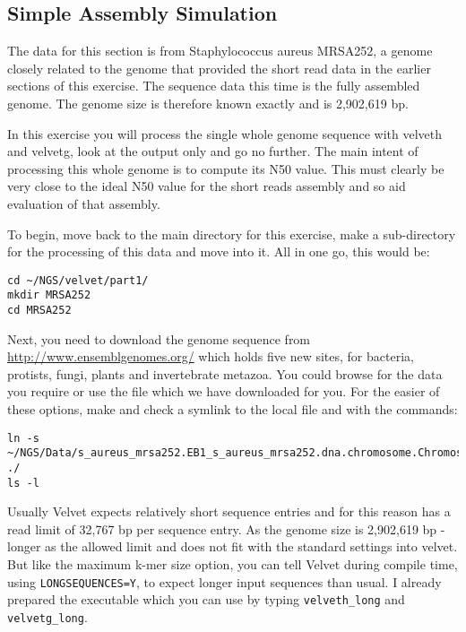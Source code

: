 \subsection{Simple Assembly Simulation}

\begin{note}
The data for this section is from Staphylococcus aureus MRSA252, a genome
closely related to the genome that provided the short read data in the earlier
sections of this exercise. The sequence data this time is the fully assembled
genome. The genome size is therefore known exactly and is 2,902,619 bp.
\end{note}

\begin{information}
In this exercise you will process the single whole genome sequence with velveth
and velvetg, look at the output only and go no further. The main intent of
processing this whole genome is to compute its N50 value. This must clearly be
very close to the ideal N50 value for the short reads assembly and so aid
evaluation of that assembly.
\end{information}

\begin{steps}
To begin, move back to the main directory for this exercise, make a
sub-directory for the processing of this data and move into it. All in one go,
this would be:
\begin{lstlisting}
cd ~/NGS/velvet/part1/ 
mkdir MRSA252 
cd MRSA252
\end{lstlisting}

Next, you need to download the genome sequence from
\url{http://www.ensemblgenomes.org/} which holds five new sites, for bacteria,
protists, fungi, plants and invertebrate metazoa. You could browse for the data
you require or use the file which we have downloaded for you. For the easier of
these options, make and check a symlink to the local file and with the
commands:
\begin{lstlisting}
ln -s ~/NGS/Data/s_aureus_mrsa252.EB1_s_aureus_mrsa252.dna.chromosome.Chromosome.fa.gz ./
ls -l
\end{lstlisting}

\end{steps}

\begin{note}
Usually Velvet expects relatively short sequence entries and for this reason has
a read limit of 32,767 bp per sequence entry. As the genome size is 2,902,619 bp
- longer as the allowed limit and does not fit with the standard settings into
velvet. But like the maximum k-mer size option, you can tell Velvet during
compile time, using \texttt{LONGSEQUENCES=Y}, to expect longer input sequences
than usual. I already prepared the executable which you can use by typing
\texttt{velveth\_long} and \texttt{velvetg\_long}.
\end{note}

